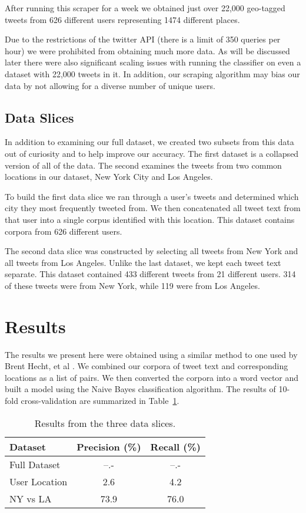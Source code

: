 \documentclass[12pt]{article}
\begin{document}
After running this scraper for a week we obtained just over 22,000 geo-tagged tweets from 626 different users representing 1474 different places.

Due to the restrictions of the twitter API (there is a limit of 350 queries per hour) we were prohibited from obtaining much more data. As will be discussed later there were also significant scaling issues with running the classifier on even a dataset with 22,000 tweets in it. In addition, our scraping algorithm may bias our data by not allowing for a diverse number of unique users. 

\subsection*{Data Slices}
In addition to examining our full dataset, we created two subsets from this data out of curiosity and to help improve our accuracy. The first dataset is a collapsed version of all of the data. The second examines the tweets from two common locations in our dataset, New York City and Los Angeles. 

To build the first data slice we ran through a user's tweets and determined which city they most frequently tweeted from. We then concatenated all tweet text from that user into a single corpus identified with this location. This dataset contains corpora from 626 different users. 

The second data slice was constructed by selecting all tweets from New York and all tweets from Los Angeles. Unlike the last dataset, we kept each tweet text separate. This dataset contained 433 different tweets from 21 different users. 314 of these tweets were from New York, while 119 were from Los Angeles. 

\section*{Results}
The results we present here were obtained using a similar method to one used by Brent Hecht, et al \cite{bhecht}. We combined our corpora of tweet text and corresponding locations as a list of pairs. We then converted the corpora into a word vector and built a model using the Naive Bayes classification algorithm. The results of 10-fold cross-validation are summarized in Table~\ref{table:results}. 
\begin{table}
	\begin{center}
		\begin{tabular}{| l || c | c |}
			\hline
			Dataset & Precision (\%) & Recall (\%) \\ \hline
			Full Dataset & --.- & --.- \\ \hline
			User Location & 2.6 & 4.2 \\ \hline
			NY vs LA & 73.9 & 76.0 \\
			\hline
		\end{tabular}
	\end{center}
	\caption{Results from the three data slices.}
	\label{table:results}
\end{table}
\end{document}
